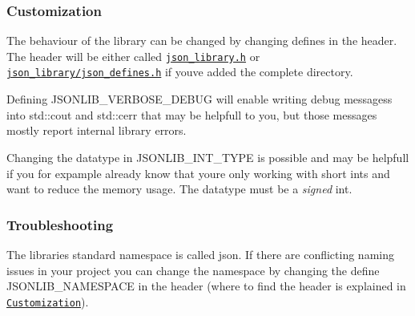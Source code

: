 \subsubsection*{\label{_customization_section}%
Customization}

The behaviour of the library can be changed by changing defines in the header. The header will be either called \href{https://github.com/n0dex/cppjsonlib/blob/master/json_library.h}{\tt json\+\_\+library.\+h} or \href{https://github.com/n0dex/cppjsonlib/blob/master/json_library_source/json_defines.h}{\tt json\+\_\+library/json\+\_\+defines.\+h} if you\textquotesingle{}ve added the complete directory.


\begin{DoxyItemize}
\item Defining {\ttfamily J\+S\+O\+N\+L\+I\+B\+\_\+\+V\+E\+R\+B\+O\+S\+E\+\_\+\+D\+E\+B\+UG} will enable writing debug messagess into {\ttfamily std\+::cout} and {\ttfamily std\+::cerr} that may be helpfull to you, but those messages mostly report internal library errors.
\item Changing the datatype in {\ttfamily J\+S\+O\+N\+L\+I\+B\+\_\+\+I\+N\+T\+\_\+\+T\+Y\+PE} is possible and may be helpfull if you for expample already know that youre only working with short ints and want to reduce the memory usage. The datatype must be a {\itshape signed} int.
\end{DoxyItemize}

\subsubsection*{\label{_troubleshooting_section}%
Troubleshooting}


\begin{DoxyItemize}
\item The libraries standard namespace is called {\ttfamily json}. If there are conflicting naming issues in your project you can change the namespace by changing the define {\ttfamily J\+S\+O\+N\+L\+I\+B\+\_\+\+N\+A\+M\+E\+S\+P\+A\+CE} in the header (where to find the header is explained in \href{#customization_section}{\tt Customization}). 
\end{DoxyItemize}